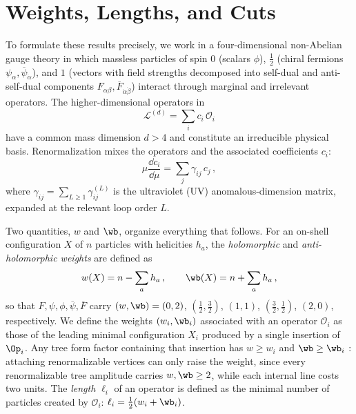 \section{Weights, Lengths, and Cuts\label{sec:2loopsetup}}

To formulate these results precisely, we work in a four-dimensional non-Abelian gauge theory in which massless particles of spin $0$ (scalars $\phi$), $\frac{1}{2}$ (chiral fermions $\psi_\alpha,\overline\psi_{\dot\alpha}$), and $1$ (vectors with field strengths decomposed into self-dual and anti-self-dual components $F_{\alpha\beta},\overline F_{\dot\alpha\dot\beta}$) interact through marginal and irrelevant operators.
The higher-dimensional operators in
\begin{equation}
    \mathcal L^{(d)} = \sum_i c_i \, \mathcal O_i
\end{equation}
have a common mass dimension $d > 4$ and constitute an irreducible physical basis.
%
Renormalization mixes the operators and the associated coefficients $c_i$:
\begin{equation}
    \mu \frac{\dd c_i}{\dd \mu} = \sum_j \gamma_{ij}\,c_j\,,
\end{equation}
where $\gamma_{ij} = \sum_{L\ge 1}\gamma_{ij}^{(L)}$ is the ultraviolet (UV) anomalous-dimension matrix, 
expanded at the relevant loop order $L$.

Two quantities, $w$ and $\wb$,
organize everything that follows.
For an on-shell configuration $X$ of $n$ particles with helicities $h_a$, the \textit{holomorphic} and \textit{anti-holomorphic
weights} \cite{Cheung:2015aba} are defined as
\begin{equation}
w(X)=n-\sum_a h_a \,,
\qquad
\wb(X)=n+\sum_a h_a \,,
\label{eq:weights}
\end{equation}
so that $F,\psi,\phi,\overline\psi,\overline F$ carry $(w,\wb)=(0,2)$, $(\tfrac12,\tfrac32)$, $(1,1)$, $(\tfrac32,\tfrac12)$, $(2,0)$, respectively. 
We define the weights $(w_i,\wb_i)$ associated with an operator $\mathcal O_i$ as those of the leading
minimal configuration $X_i$ produced by a single insertion of $\Op_i$. 
Any tree form factor containing that insertion has $w\ge w_i$ and $\wb\ge\wb_i$ \cite{Cheung:2015aba}: attaching renormalizable vertices can only raise the weight, since every renormalizable tree amplitude
carries $w,\wb \ge 2$, while each internal line costs two units.
The \textit{length} $\ell_i$ of an operator is defined as the minimal number of particles created by $\mathcal O_i$: $\ell_i = \frac{1}{2}(w_i + \wb_i)$.

